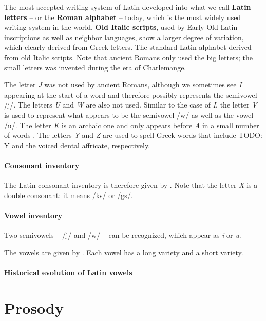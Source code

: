 \documentclass[a4paper, oneside, 12pt]{report}
\newcommand*{\citechap}[1]{chap.~{#1}}
\newcommand*{\citetable}[1]{Table~{#1}}
\newcommand*{\concept}[1]{\textbf{#1}}
\newcommand{\form}[1]{\emph{#1}}
\begin{document}
The most accepted writing system of Latin developed into 
what we call \concept{Latin letters} -- or the \concept{Roman alphabet} -- today, 
which is the most widely used writing system in the world.
\concept{Old Italic scripts},
used by Early Old Latin inscriptions 
as well as neighbor languages,
show a larger degree of variation, 
which clearly derived from Greek letters.
The standard Latin alphabet derived from old Italic scripts.
Note that ancient Romans only used the big letters;
the small letters was invented during the era of Charlemange.

The letter \form{J} was not used by ancient Romans, 
although we sometimes see \form{I} appearing at the start of a word 
and therefore possibly represents the semivowel /j/.
The letters \form{U} and \form{W} are also not used.
Similar to the case of \form{I},
the letter \form{V} is used to represent 
what appears to be the semivowel /w/ 
as well as the vowel /u/. 
The letter \form{K} is an archaic one 
and only appears before \form{A} in a small number of words
\citep[\citechap{2}]{oniga2014latin}.
The letters \form{Y} and \form{Z} are used to spell Greek words that 
include TODO: Y and the voiced dental affricate, respectively.

\paragraph*{Consonant inventory}
The Latin consonant inventory is therefore given by \citet[\citetable{3.1}]{oniga2014latin}.
Note that the letter \form{X} is a double consonant: 
it means /ks/ or /gs/.

\paragraph*{Vowel inventory}
Two semivowels -- /j/ and /w/ -- can be recognized,
which appear as \form{i} or \form{u}.

The vowels are given by \citet[\citetable{3.2}]{oniga2014latin}.
Each vowel has a long variety and a short variety.

\paragraph*{Historical evolution of Latin vowels}


\section{Prosody}
\end{document}

